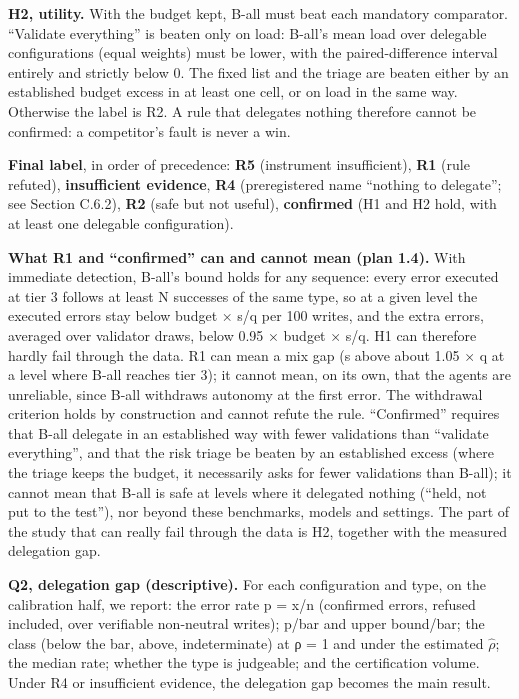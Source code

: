 \textbf{H2, utility.} With the budget kept, B-all must beat each mandatory comparator. ``Validate everything'' is beaten only on load: B-all's mean load over delegable configurations (equal weights) must be lower, with the paired-difference interval entirely and strictly below 0. The fixed list and the triage are beaten either by an established budget excess in at least one cell, or on load in the same way. Otherwise the label is R2. A rule that delegates nothing therefore cannot be confirmed: a competitor's fault is never a win.

\textbf{Final label}, in order of precedence: \textbf{R5} (instrument insufficient), \textbf{R1} (rule refuted), \textbf{insufficient evidence}, \textbf{R4} (preregistered name ``nothing to delegate''; see Section C.6.2), \textbf{R2} (safe but not useful), \textbf{confirmed} (H1 and H2 hold, with at least one delegable configuration).

\textbf{What R1 and ``confirmed'' can and cannot mean (plan 1.4).} With immediate detection, B-all's bound holds for any sequence: every error executed at tier 3 follows at least N successes of the same type, so at a given level the executed errors stay below budget × s/q per 100 writes, and the extra errors, averaged over validator draws, below 0.95 × budget × s/q. H1 can therefore hardly fail through the data. R1 can mean a mix gap (s above about 1.05 × q at a level where B-all reaches tier 3); it cannot mean, on its own, that the agents are unreliable, since B-all withdraws autonomy at the first error. The withdrawal criterion holds by construction and cannot refute the rule. ``Confirmed'' requires that B-all delegate in an established way with fewer validations than ``validate everything'', and that the risk triage be beaten by an established excess (where the triage keeps the budget, it necessarily asks for fewer validations than B-all); it cannot mean that B-all is safe at levels where it delegated nothing (``held, not put to the test''), nor beyond these benchmarks, models and settings. The part of the study that can really fail through the data is H2, together with the measured delegation gap.

\textbf{Q2, delegation gap (descriptive).} For each configuration and type, on the calibration half, we report: the error rate p = x/n (confirmed errors, refused included, over verifiable non-neutral writes); p/bar and upper bound/bar; the class (below the bar, above, indeterminate) at ρ = 1 and under the estimated \ensuremath{\hat{\rho}}; the median rate; whether the type is judgeable; and the certification volume. Under R4 or insufficient evidence, the delegation gap becomes the main result.

